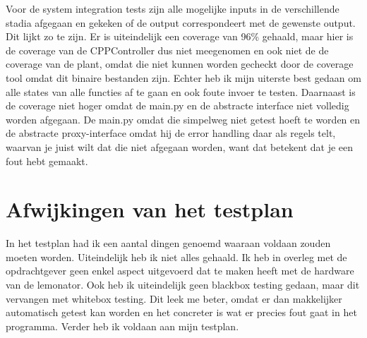 \documentclass{article}
\begin{document}
	Voor de system integration tests zijn alle mogelijke inputs in de verschillende stadia afgegaan en gekeken of de output correspondeert met de gewenste output. Dit lijkt zo te zijn. Er is uiteindelijk een coverage van 96\% gehaald, maar hier is de coverage van de CPPController dus niet meegenomen en ook niet de de coverage van de plant, omdat die niet kunnen worden gecheckt door de coverage tool omdat dit binaire bestanden zijn. Echter heb ik mijn uiterste best gedaan om alle states van alle functies af te gaan en ook foute invoer te testen. Daarnaast is de coverage niet hoger omdat de main.py en de abstracte interface niet volledig worden afgegaan. De main.py omdat die simpelweg niet getest hoeft te worden en de abstracte proxy-interface omdat hij de error handling daar als regels telt, waarvan je juist wilt dat die niet afgegaan worden, want dat betekent dat je een fout hebt gemaakt.
	
	\section{Afwijkingen van het testplan}
	In het testplan had ik een aantal dingen genoemd waaraan voldaan zouden moeten worden. Uiteindelijk heb ik niet alles gehaald. Ik heb in overleg met de opdrachtgever geen enkel aspect uitgevoerd dat te maken heeft met de hardware van de lemonator. Ook heb ik uiteindelijk geen blackbox testing gedaan, maar dit vervangen met whitebox testing. Dit leek me beter, omdat er dan makkelijker automatisch getest kan worden en het concreter is wat er precies fout gaat in het programma. Verder heb ik voldaan aan mijn testplan.
    
\end{document}
